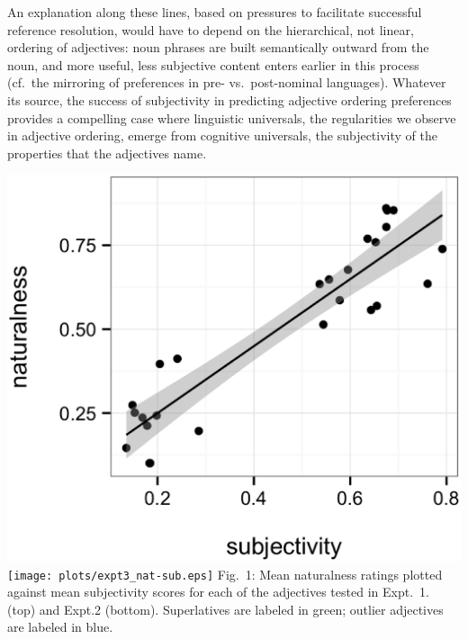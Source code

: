 \documentclass[10pt]{article}
\begin{document}
An explanation along these lines, based on pressures to facilitate successful reference resolution, would have to depend on the hierarchical, not linear, ordering of adjectives: noun phrases are built semantically outward from the noun, and more useful, less subjective content enters earlier in this process (cf.~the mirroring of preferences in pre- vs.~post-nominal languages). 
Whatever its source, the success of subjectivity in predicting adjective ordering preferences provides a compelling case where linguistic universals, the regularities we observe in adjective ordering, emerge from cognitive universals, the subjectivity of the properties that the adjectives name.

\noindent\begin{minipage}{.32\textwidth}
		\includegraphics[width=.95\linewidth]{plots/naturalness-subjectivity-new.eps}\\
		\texttt{[image: plots/expt3\_nat-sub.eps]}
		Fig.~1: Mean naturalness ratings plotted against mean subjectivity scores for each of the adjectives tested in Expt.~1. (top) and Expt.2 (bottom). Superlatives are labeled in green; outlier adjectives are labeled in blue.
\end{minipage} 
\end{document}
